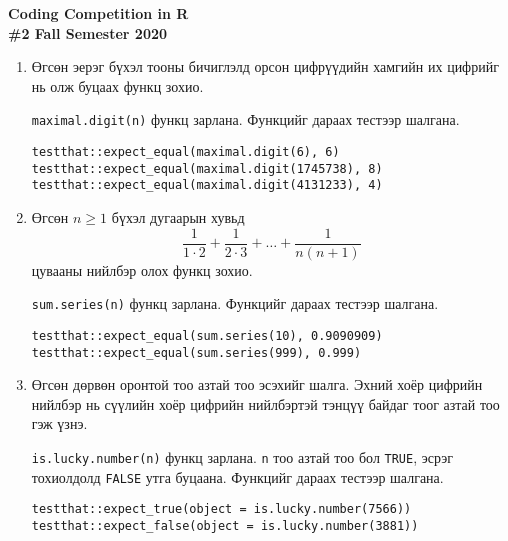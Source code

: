\documentclass[11pt]{letter}
\begin{document}
\begin{center}
\bfseries
\Large Coding Competition in R \\
\large \#2 Fall Semester 2020
\end{center}
\begin{enumerate}
\item Өгсөн эерэг бүхэл тооны бичиглэлд орсон цифрүүдийн хамгийн их цифрийг нь олж буцаах функц зохио.
\par
\lstinline[otherkeywords={maximal.digit}]|maximal.digit(n)| функц зарлана. Функцийг дараах тестээр шалгана.
\begin{lstlisting}[otherkeywords={maximal.digit,expect_equal}]
testthat::expect_equal(maximal.digit(6), 6)
testthat::expect_equal(maximal.digit(1745738), 8)
testthat::expect_equal(maximal.digit(4131233), 4)
\end{lstlisting}
\item Өгсөн $n\geq1$ бүхэл дугаарын хувьд $$\dfrac{1}{1\cdot2}+\dfrac{1}{2\cdot3}+\ldots+\dfrac{1}{n(n+1)}$$ цувааны нийлбэр олох функц зохио.
\par
\lstinline[otherkeywords={sum.series}]|sum.series(n)| функц зарлана. Функцийг дараах тестээр шалгана.
\begin{lstlisting}[otherkeywords={sum.series,expect_equal}]
testthat::expect_equal(sum.series(10), 0.9090909)
testthat::expect_equal(sum.series(999), 0.999)
\end{lstlisting}
\item Өгсөн дөрвөн оронтой тоо азтай тоо эсэхийг шалга. Эхний хоёр цифрийн нийлбэр нь сүүлийн хоёр цифрийн нийлбэртэй тэнцүү байдаг тоог азтай тоо гэж үзнэ.
\par \lstinline[otherkeywords={is.lucky.number}]|is.lucky.number(n)| функц зарлана. \lstinline|n| тоо азтай тоо бол \lstinline|TRUE|, эсрэг тохиолдолд \lstinline|FALSE| утга буцаана. Функцийг дараах тестээр шалгана.
\begin{lstlisting}[otherkeywords={is.lucky.number,expect_true,expect_false}]
testthat::expect_true(object = is.lucky.number(7566))
testthat::expect_false(object = is.lucky.number(3881))
\end{lstlisting}
\end{enumerate}
\end{document}
